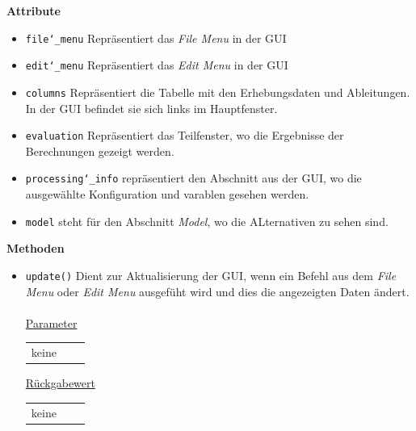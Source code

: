 \documentclass{article}
\begin{document}
\textbf{{Attribute}}
\begin{itemize}
\item \texttt{file\char`_menu} \newline Repräsentiert das \textit{File Menu} in der GUI
\item \texttt{edit\char`_menu} \newline Repräsentiert das \textit{Edit Menu} in der GUI
\item \texttt{columns} \newline Repräsentiert die Tabelle mit den Erhebungsdaten und Ableitungen. In der GUI befindet sie sich links im Hauptfenster.
\item \texttt{evaluation} \newline Repräsentiert das Teilfenster, wo die Ergebnisse der Berechnungen gezeigt werden.
\item \texttt{processing\char`_info} \newline repräsentiert den Abschnitt aus der GUI, wo die ausgewählte Konfiguration und varablen gesehen werden.
\item \texttt{model} \newline steht für den Abschnitt \textit{Model}, wo die ALternativen zu sehen sind.
\end{itemize}

\textbf{{Methoden}}
\begin{itemize}
\item \texttt{update()} \newline Dient zur Aktualisierung der GUI, wenn ein Befehl aus dem \textit{File Menu} oder \textit{Edit Menu} ausgefüht wird und dies die angezeigten Daten ändert.
\\\\
\underline{{Parameter}}
\begin{tabular}{lll}
 keine \\
\end{tabular}

\underline{{Rückgabewert}}
\begin{tabular}{lll}
 keine \\
\end{tabular}
\end{itemize}
\end{document}
